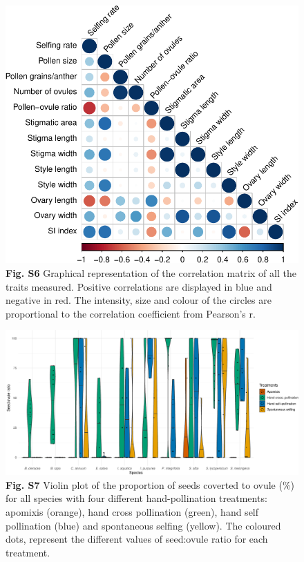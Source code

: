 \documentclass[12pt,]{article}
\begin{document}
\begin{figure}
\centering
\includegraphics{Supp_Material_files/figure-latex/unnamed-chunk-15-1.pdf}
\caption{\textbf{Fig. S6} Graphical representation of the correlation
matrix of all the traits measured. Positive correlations are displayed
in blue and negative in red. The intensity, size and colour of the
circles are proportional to the correlation coefficient from Pearson's
r.}
\end{figure}

\clearpage

\begin{figure}
\centering
\includegraphics{Supp_Material_files/figure-latex/unnamed-chunk-16-1.pdf}
\caption{\textbf{Fig. S7} Violin plot of the proportion of seeds
coverted to ovule (\%) for all species with four different
hand-pollination treatments: apomixis (orange), hand cross pollination
(green), hand self pollination (blue) and spontaneous selfing (yellow).
The coloured dots, represent the different values of seed:ovule ratio
for each treatment.}
\end{figure}
\end{document}
